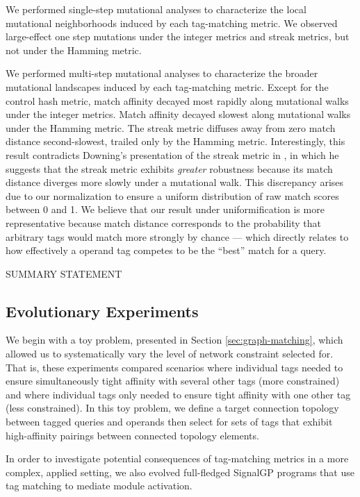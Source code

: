 We performed single-step mutational analyses to characterize the local mutational neighborhoods induced by each tag-matching metric.
We observed large-effect one step mutations under the integer metrics and streak metrics, but not under the Hamming metric.

We performed multi-step mutational analyses to characterize the broader mutational landscapes induced by each tag-matching metric.
Except for the control hash metric, match affinity decayed most rapidly along mutational walks under the integer metrics.
Match affinity decayed slowest along mutational walks under the Hamming metric.
The streak metric diffuses away from zero match distance second-slowest, trailed only by the Hamming metric.
Interestingly, this result contradicts Downing's presentation of the streak metric in \citep{downing2015intelligence}, in which he suggests that the streak metric exhibits \textit{greater} robustness because its match distance diverges more slowly under a mutational walk.
This discrepancy arises due to our normalization to ensure a uniform distribution of raw match scores between 0 and 1.
We believe that our result under uniformification is more representative because match distance corresponds to the probability that arbitrary tags would match more strongly by chance --- which directly relates to how effectively a operand tag competes to be the ``best'' match for a query.

SUMMARY STATEMENT

\subsection{Evolutionary Experiments}

We begin with a toy problem, presented in Section \ref{sec:graph-matching}, which allowed us to systematically vary the level of network constraint selected for.
That is, these experiments compared scenarios where individual tags needed to ensure simultaneously tight affinity with several other tags (more constrained) and where individual tags only needed to ensure tight affinity with one other tag (less constrained).
In this toy problem, we define a target connection topology between tagged queries and operands then select for sets of tags that exhibit high-affinity pairings between connected topology elements.

In order to investigate potential consequences of tag-matching metrics in a more complex, applied setting, we also evolved full-fledged SignalGP programs that use tag matching to mediate module activation.

